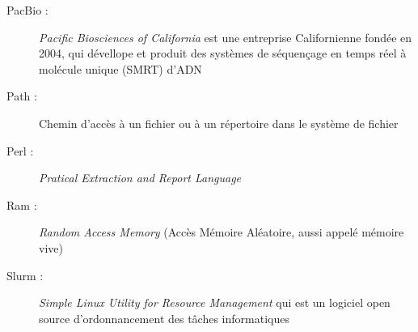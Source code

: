 \begin{description}
    \item[PacBio :] \emph{Pacific Biosciences of California} est une entreprise Californienne fondée en 2004, qui dévellope et produit des systèmes de séquençage en temps réel à molécule unique (SMRT) d'ADN
    \item[Path : ] Chemin d'accès à un fichier ou à un répertoire dans le système de fichier
    \item[Perl :] \emph{Pratical Extraction and Report Language}
    \item[Ram :] \emph{Random Access Memory} (Accès Mémoire Aléatoire, aussi appelé mémoire vive)
    \item[Slurm :] \emph{Simple Linux Utility for Resource Management} qui est un logiciel open source d'ordonnancement des tâches informatiques
\end{description}